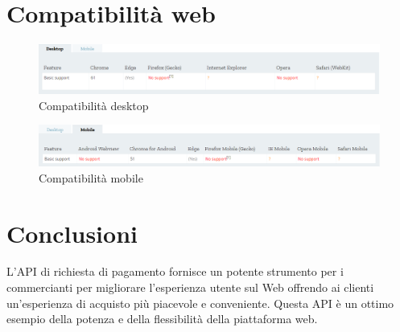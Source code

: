 \documentclass[italian]{article}
\begin{document}
	\section{Compatibilità web}
	\begin{figure}[h]
		\centering
		\includegraphics[width=1\linewidth]{Compatibilita1}
		\caption{Compatibilità desktop}
		\label{fig: Compatibilità desktop}
	\end{figure}
	\begin{figure}[h]
		\centering
		\includegraphics[width=1\linewidth]{Compatibilita2}
		\caption{Compatibilità mobile}
		\label{fig: Compatibilità mobile}
	\end{figure}

	\section{Conclusioni}
	L'API di richiesta di pagamento fornisce un potente strumento per i commercianti per migliorare l'esperienza utente sul Web offrendo ai clienti un'esperienza di acquisto più piacevole e conveniente. Questa API è un ottimo esempio della potenza e della flessibilità della piattaforma web.
\end{document}
